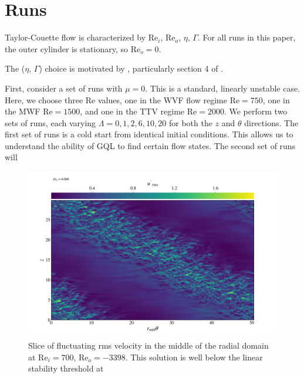 \documentclass[openacc]{rstransa}%
\newcommand{\Reyn}{\mathrm{Re}}
\begin{document}
\section{Runs}
\label{sec:nonlinear}
Taylor-Couette flow is characterized by $\Reyn_i$, $\Reyn_o$, $\eta$, $\Gamma$. For all runs in this paper, the outer cylinder is stationary, so $\Reyn_o = 0$.

The ($\eta$, $\Gamma$) choice is motivated by \cite{1984JFM...146...45M,1984JFM...146...65M}, particularly section 4 of \cite{1984JFM...146...65M}.

First, consider a set of runs with $\mu = 0$. This is a standard, linearly unstable case. Here, we choose three $\Reyn$ values, one in the WVF flow regime $\Reyn =750$, one in the MWF $\Reyn = 1500$, and one in the TTV regime $\Reyn = 2000$. We perform two sets of runs, each varying $\Lambda = {0, 1, 2, 6, 10, 20}$ for both the $z$ and $\theta$ directions. The first set of runs is a cold start from identical initial conditions. This allows us to understand the ability of GQL to find certain flow states. The second set of runs will 

\begin{figure}
    \centering
    \includegraphics[width=\textwidth]{../figs/urms_tz_rei_700_reo-3398_000278.png}
    \caption{Slice of fluctuating rms velocity in the middle of the radial domain at $\Reyn_i = 700$, $\Reyn_o = -3398$. This solution is well below the linear stability threshold at }
    \label{fig:urms_tz_rei700}
\end{figure}
\end{document}

